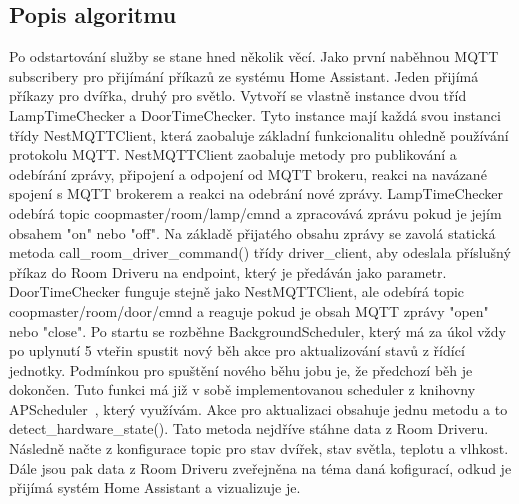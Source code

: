 \subsection*{Popis algoritmu}
Po odstartování služby se stane hned několik věcí.
Jako první naběhnou MQTT subscribery pro přijímání příkazů ze systému Home Assistant.
Jeden přijímá příkazy pro dvířka, druhý pro světlo.
Vytvoří se vlastně instance dvou tříd LampTimeChecker a DoorTimeChecker. \newline
Tyto instance mají každá svou instanci třídy NestMQTTClient, která zaobaluje základní funkcionalitu ohledně používání protokolu MQTT.
NestMQTTClient zaobaluje metody pro publikování a odebírání zprávy, připojení a odpojení od MQTT brokeru, reakci na navázané spojení s MQTT brokerem a reakci na odebrání nové zprávy.
LampTimeChecker odebírá topic coopmaster/room/lamp/cmnd  a zpracovává zprávu pokud je jejím obsahem "on" nebo "off".
Na základě přijatého obsahu zprávy se zavolá statická metoda call\_room\_driver\_command() třídy driver\_client, aby odeslala příslušný příkaz do Room Driveru na endpoint, který je předáván jako parametr.
DoorTimeChecker funguje stejně jako NestMQTTClient, ale odebírá topic coopmaster/room/door/cmnd  a reaguje pokud je obsah MQTT zprávy "open" nebo "close".\newline
Po startu se rozběhne BackgroundScheduler, který má za úkol vždy po uplynutí 5 vteřin spustit nový běh akce pro aktualizování stavů z řídící jednotky.
Podmínkou pro spuštění nového běhu jobu je, že předchozí běh je dokončen.
Tuto funkci má již v sobě implementovanou scheduler z knihovny APScheduler~\cite{APScheduler}, který využívám.
Akce pro aktualizaci obsahuje jednu metodu a to detect\_hardware\_state().
Tato metoda nejdříve stáhne data z Room Driveru.
Následně načte z konfigurace topic pro stav dvířek, stav světla, teplotu a vlhkost.
Dále jsou pak data z Room Driveru zveřejněna na téma daná kofigurací, odkud je přijímá systém Home Assistant a vizualizuje je.

